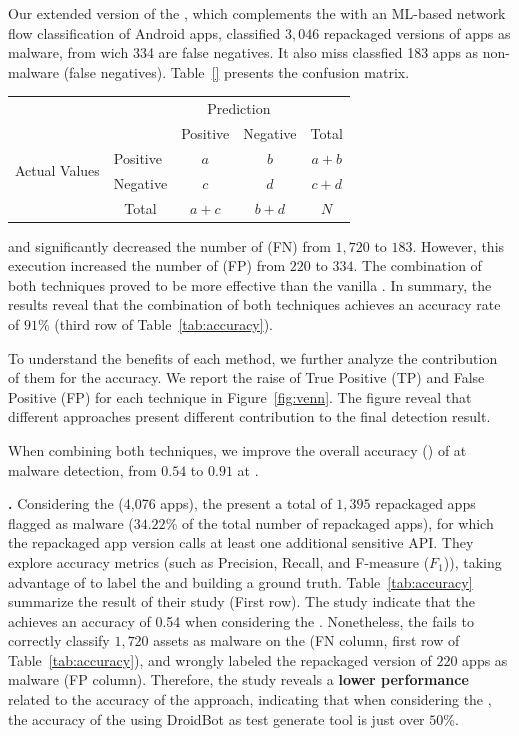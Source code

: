 Our extended version of the \mas, which complements the \mas with an ML-based network flow classification of Android apps, classified $3,046$ repackaged versions of apps as malware, from wich 334 are false negatives. It also miss classfied 183 apps as non-malware (false negatives). Table~\ref{} presents the confusion matrix.

\begin{tabular}{l|l|c|c|c}
\multicolumn{2}{c}{}&\multicolumn{2}{c}{Prediction}&\\
\cline{3-4}
\multicolumn{2}{c|}{}&Positive&Negative&\multicolumn{1}{c}{Total}\\
\cline{2-4}
\multirow{2}{*}{Actual Values}& Positive & $a$ & $b$ & $a+b$\\
\cline{2-4}
& Negative & $c$ & $d$ & $c+d$\\
\cline{2-4}
\multicolumn{1}{c}{} & \multicolumn{1}{c}{Total} & \multicolumn{1}{c}{$a+c$} & \multicolumn{    1}{c}{$b+d$} & \multicolumn{1}{c}{$N$}\\
\end{tabular}

and significantly decreased the number of (FN) from $1,720$ to $183$. However, this execution increased the number of (FP) from $220$ to $334$. The combination of both techniques proved to be more effective than the vanilla \mas. In summary, the results reveal that the combination of both techniques achieves an accuracy rate of $91$\% (third row of Table~\ref{tab:accuracy}).

To understand the benefits of each method, we further analyze the contribution of them for the accuracy. We report the raise of True Positive (TP) and False Positive (FP) for each technique in Figure~\ref{fig:venn}. The figure reveal that different approaches present different contribution to the final detection result.

\begin{finding}
When combining both techniques, we improve the overall accuracy (\fone) of \mas at malware detection, from $0.54$ to $0.91$ at \cds.
\end{finding}


{\bf \mas.} Considering the \cds (4,076 apps), the \fhc present
a total of {$1,395$} repackaged apps flagged as malware ({$34.22$\%} of the total number of repackaged apps), for which the repackaged app version calls at least one additional sensitive API. They explore accuracy metrics (such as Precision, Recall, and F-measure ($F_1$)), taking advantage of \vt to label the \cds and building a ground truth. Table~\ref{tab:accuracy} summarize the result of their study (First row). The study indicate that the \mas achieves an accuracy of 0.54 when considering the \cds. Nonetheless, the \mas fails to correctly classify $1,720$ assets as malware on the \cds (FN column, first row of Table~\ref{tab:accuracy}), and wrongly labeled the repackaged version of $220$ apps as malware (FP column). Therefore, the study reveals a {\bf lower performance} related to the accuracy of the approach, indicating that when considering the \cds, the accuracy of the \mas using DroidBot as test generate tool is just over $50$\%.


